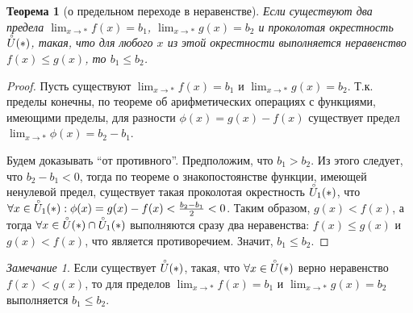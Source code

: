 \documentclass[a4paper,12pt]{article} %
\newtheorem{theorem}{Теорема}[section]
\theoremstyle{remark}
\newtheorem{remark}{Замечание}[theorem]
\theoremstyle{definition}
\begin{document}
\begin{theorem}[о предельном переходе в неравенстве]
	Если существуют два предела $\lim_{x \to *} f(x) = b_1$, $\lim_{x \to *} g(x) = b_2$ и проколотая окрестность $\accentset{\circ}{U}(*)$, такая, что для любого $x$ из этой окрестности выполняется неравенство $f(x) \le g(x)$, то $b_1\le b_2$.
\end{theorem}
\begin{proof}
	Пусть существуют $\lim_{x \to *} f(x) = b_1$ и $\lim_{x \to *} g(x) = b_2$. Т.к. пределы конечны, по теореме об арифметических операциях с функциями, имеющими пределы, для разности $\phi(x) = g(x) - f(x)$ существует предел $\lim_{x \to *} \phi(x) = b_2-b_1$.

	Будем доказывать ``от противного''. Предположим, что $b_1>b_2$. Из этого следует, что $b_2-b_1<0$, тогда по теореме о знакопостоянстве функции, имеющей ненулевой предел, существует такая проколотая окрестность $\accentset{\circ}{U}_1(*)$, что $\forall x \in  \accentset{\circ}{U}_1(*) : \phi(x) = g(x) - f(x) < \frac{b_2-b_1}{2} < 0$. Таким образом, $g(x) < f(x)$, а тогда $\forall x \in  \accentset{\circ}{U}(*) \cap \accentset{\circ}{U}_1(*)$ выполняются сразу два неравенства: $f(x) \le  g(x)$ и $g(x) < f(x)$, что является противоречием. Значит, $b_1\le b_2$.
\end{proof}

\begin{remark}
	Если существует $\accentset{\circ}{U}(*)$, такая, что $\forall x \in  \accentset{\circ}{U}(*)$ верно неравенство $f(x) < g(x)$, то для пределов $\lim_{x \to *} f(x) = b_1$ и $\lim_{x \to *} g(x) = b_2$ выполняется $b_1\le b_2$.
\end{remark}
\end{document}
